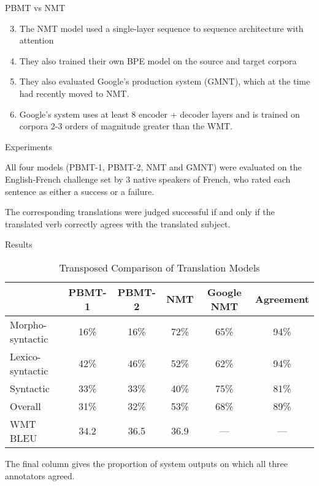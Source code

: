 \documentclass{beamer}
\begin{document}
\begin{frame}{PBMT vs NMT}

  \begin{enumerate}
  \setcounter{enumi}{2}
    \item The NMT model used a single-layer sequence to sequence architecture with attention
    \item They also trained their own BPE model on the source and target corpora
    \item They also evaluated Google's production system (GMNT), which at the time had recently moved to NMT.
    \item Google's system uses at least 8 encoder + decoder layers and is trained on corpora 2-3 orders of magnitude greater than the WMT.
  \end{enumerate}
  
  \medskip

\end{frame}

\begin{frame}{Experiments}

  All four models (PBMT-1, PBMT-2, NMT and GMNT) were evaluated on the English-French challenge set by 3  native speakers of French, who rated each sentence as either a success or a failure.

  \medskip

  The corresponding translations were judged successful if and only if the translated verb correctly agrees with the translated subject.

\end{frame}

\begin{frame}{Results}

  {\footnotesize
    \begin{table}[htbp]
      \centering
      \caption{Transposed Comparison of Translation Models}
      \label{tab:transposed_translation_models}
      \begin{tabular}{lccccc}
        \toprule
        & PBMT-1 & PBMT-2 & NMT & Google NMT & Agreement \\
        \midrule
        Morpho-syntactic & 16\%   & 16\%   & 72\% & 65\% & 94\% \\
        Lexico-syntactic & 42\%   & 46\%   & 52\% & 62\% & 94\% \\
        Syntactic        & 33\%   & 33\%   & 40\% & 75\% & 81\% \\
        Overall          & 31\%   & 32\%   & 53\% & 68\% & 89\% \\
        \midrule
        WMT BLEU         & 34.2   & 36.5   & 36.9 & ---  &  ---   \\
        \bottomrule
      \end{tabular}
    \end{table}
  }

  The final column gives the proportion of system outputs on which all three annotators agreed.

\end{frame}
\end{document}
